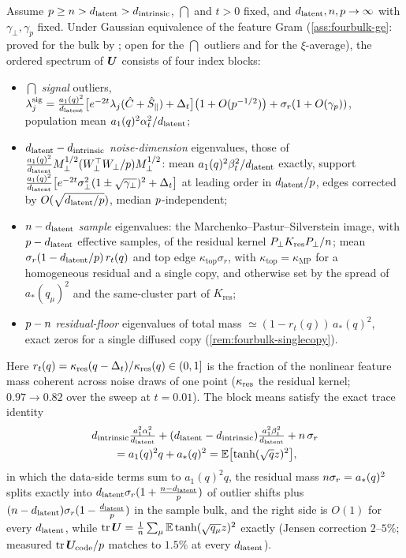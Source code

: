\begin{proposition}\label{prop:fourbulk-main}
Assume $p\ge n>d_{\mathrm{latent}}>d_{\mathrm{intrinsic}}$, $\dint$ and $t>0$ fixed, and $d_{\mathrm{latent}},n,p\to\infty$ with $\gamma_\perp,\gamma_p$ fixed. Under Gaussian equivalence of the feature Gram (\cref{ass:fourbulk-ge}: proved for the bulk by \citealp{louart2018random,liao2018spectrum}; open for the $\dint$ outliers and for the $\xi$-average), the ordered spectrum of $\bm{U}$ consists of four index blocks:
\begin{itemize}\setlength\itemsep{0pt}
\item[(i)] $\dint$ \emph{signal} outliers, $\lambda^{\mathrm{sig}}_j=\tfrac{a_1(q)^2}{d_{\mathrm{latent}}}\bigl[e^{-2t}\lambda_j(\hat C+\hat S_\parallel)+\Delta_t\bigr]\bigl(1+O(p^{-1/2})\bigr)+\sigma_r(1+O(\gamma_p))$, population mean $a_1(q)^2\alpha_t^2/d_{\mathrm{latent}}$;
\item[(ii)] $d_{\mathrm{latent}}-d_{\mathrm{intrinsic}}$ \emph{noise-dimension} eigenvalues, those of $\tfrac{a_1(q)^2}{d_{\mathrm{latent}}}M_\perp^{1/2}(W_\perp^{\top}W_\perp/p)M_\perp^{1/2}$: mean $a_1(q)^2\beta_t^2/d_{\mathrm{latent}}$ exactly, support $\tfrac{a_1(q)^2}{d_{\mathrm{latent}}}\bigl[e^{-2t}\sigma_{\perp}^2(1\pm\sqrt{\gamma_\perp})^2+\Delta_t\bigr]$ at leading order in $d_{\mathrm{latent}}/p$, edges corrected by $O(\sqrt{d_{\mathrm{latent}}/p})$, median $p$-independent;
\item[(iii)] $n-d_{\mathrm{latent}}$ \emph{sample} eigenvalues: the Marchenko--Pastur--Silverstein image, with $p-d_{\mathrm{latent}}$ effective samples, of the residual kernel $P_\perp K_{\mathrm{res}}P_\perp/n$; mean $\sigma_r(1-d_{\mathrm{latent}}/p)\,r_t(q)$ and top edge $\kappa_{\mathrm{top}}\sigma_r$, with $\kappa_{\mathrm{top}}=\kappa_{\mathrm{MP}}$ for a homogeneous residual and a single copy, and otherwise set by the spread of $a_*(q_\mu)^2$ and the same-cluster part of $K_{\mathrm{res}}$;
\item[(iv)] $p-n$ \emph{residual-floor} eigenvalues of total mass $\simeq(1-r_t(q))\,a_*(q)^2$, exact zeros for a single diffused copy (\cref{rem:fourbulk-singlecopy}).
\end{itemize}
Here $r_t(q)=\kappa_{\rm res}(q-\Delta_t)/\kappa_{\rm res}(q)\in(0,1]$ is the fraction of the nonlinear feature mass coherent across noise draws of one point ($\kappa_{\rm res}$ the residual kernel; $0.97\to0.82$ over the sweep at $t=0.01$). The block means satisfy the exact trace identity
\begin{align}
&d_{\mathrm{intrinsic}}\tfrac{a_1^2\alpha_t^2}{d_{\mathrm{latent}}}+(d_{\mathrm{latent}}-d_{\mathrm{intrinsic}})\tfrac{a_1^2\beta_t^2}{d_{\mathrm{latent}}}+n\,\sigma_r\nonumber\\
&\qquad=a_1(q)^2q+a_*(q)^2=\mathbb{E}\bigl[\tanh(\sqrt qz)^2\bigr],\label{eq:fourbulk-trace-main}
\end{align}
in which the data-side terms sum to $a_1(q)^2q$, the residual mass $n\sigma_r=a_*(q)^2$ splits exactly into $d_{\mathrm{latent}}\sigma_r(1+\tfrac{n-d_{\mathrm{latent}}}{p})$ of outlier shifts plus $(n-d_{\mathrm{latent}})\sigma_r(1-\tfrac{d_{\mathrm{latent}}}{p})$ in the sample bulk, and the right side is $O(1)$ for every $d_{\mathrm{latent}}$,
while $\operatorname{tr}\bm{U}=\tfrac1{n}\sum_\mu\mathbb{E}\tanh(\sqrt{q_\mu}z)^2$ exactly (Jensen correction $2$--$5\%$; measured $\operatorname{tr}\bm{U}_{\rm code}/p$ matches to $1.5\%$ at every $d_{\mathrm{latent}}$).
\end{proposition}

